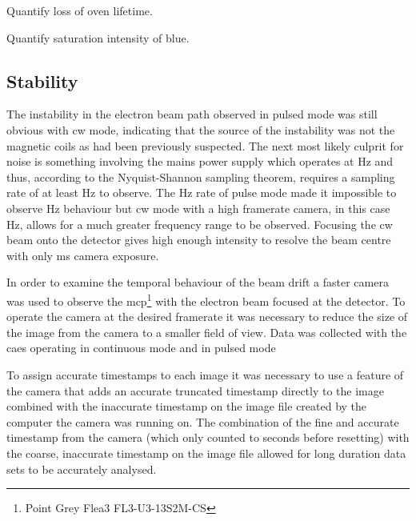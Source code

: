 {\color{red}Quantify loss of oven lifetime.

Quantify saturation intensity of blue.}

\subsection{Stability}\label{section:stability}

The instability in the electron beam path observed in pulsed mode was still obvious with \gls{cw} mode, indicating that the source of the instability was not the magnetic coils as had been previously suspected.
The next most likely culprit for noise is something involving the mains power supply which operates at \unit[50]{Hz} and thus, according to the Nyquist-Shannon sampling theorem, requires a sampling rate of at least \unit[100]{Hz} to observe.
The \unit[10]{Hz} rate of pulse mode made it impossible to observe \unit[50]{Hz} behaviour but \gls{cw} mode with a high framerate camera, in this case \unit[240]{Hz}, allows for a much greater frequency range to be observed.
Focusing the \gls{cw} beam onto the detector gives high enough intensity to resolve the beam centre with only \unit[4]{ms} camera exposure.

In order to examine the temporal behaviour of the beam drift a faster camera was used to observe the \gls{mcp}\footnote{Point Grey Flea3 FL3-U3-13S2M-CS} with the electron beam focused at the detector.
To operate the camera at the desired framerate it was necessary to reduce the size of the image from the camera to a smaller field of view.
Data was collected with the \gls{caes} operating in continuous mode and in pulsed mode

To assign accurate timestamps to each image it was necessary to use a feature of the camera that adds an accurate truncated timestamp directly to the image combined with the inaccurate timestamp on the image file created by the computer the camera was running on.
The combination of the fine and accurate timestamp from the camera (which only counted to \unit[128]{seconds} before resetting) with the coarse, inaccurate timestamp on the image file allowed for long duration data sets to be accurately analysed.

